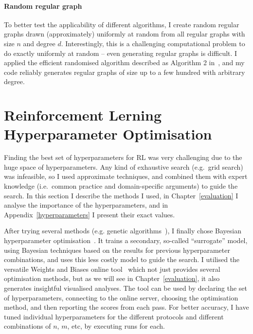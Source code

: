 \paragraph{Random regular graph} To better test the applicability of different algorithms, I create random regular graphs drawn (approximately) uniformly at random from all regular graphs with size $n$ and degree $d$. Interestingly, this is a challenging computational problem to do exactly uniformly at random -- even generating regular graphs is difficult. I applied the efficient randomised algorithm described as Algorithm 2 in~\cite{steger1999randomregulargraphs}, and my code reliably generates regular graphs of size up to a few hundred with arbitrary degree.

\section{Reinforcement Lerning Hyperparameter Optimisation}

Finding the best set of hyperparameters for RL was very challenging due to the huge space of hyperparameters. Any kind of exhaustive search (e.g.\ grid search) was infeasible, so I used approximate techniques, and combined them with expert knowledge (i.e.\ common practice and domain-specific arguments) to guide the search.
In this section I describe the methods I used, in Chapter~\ref{evaluation} I analyse the importance of the hyperparameters, and in Appendix~\ref{hyperparameters} I present their exact values.


After trying several methods (e.g. genetic algorithms~\cite{wicaksono2018genetichyper}), I finally chose Bayesian hyperparameter optimisation~\cite{eggensperger2013bayesianhyper}. It trains a secondary, so-called ``surrogate'' model, using Bayesian techniques based on the results for previous hyperparameter combinations, and uses this less costly model to guide the search. I utilised the versatile Weights and Biases online tool~\cite{biewald2020wandb} which not just provides several optimisation methods, but as we will see in Chapter~\ref{evaluation}, it also generates insightful visualised analyses. The tool can be used by declaring the set of hyperparameters, connecting to the online server, choosing the optimisation method, and then reporting the scores from each pass. For better accuracy, I have tuned individual hyperparameters for the different protocols and different combinations of $n$, $m$, etc, by executing \NumberofHyperparameterIterations runs for each.


